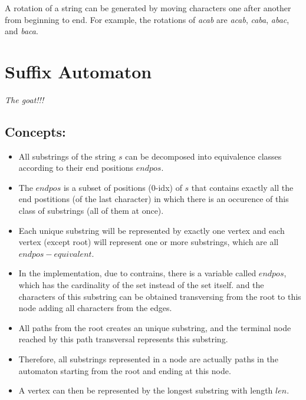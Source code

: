     A rotation of a string can be generated by moving characters one after another from beginning to end.
    For example, the rotations of \textit{acab} are \textit{acab}, \textit{caba}, \textit{abac}, and \textit{baca}.


\section{Suffix Automaton}

    \textit{The goat!!!} 

    \subsection{Concepts:}

    \begin{itemize}

        \item All substrings of the string $s$ can be decomposed into equivalence classes according to their end positions $endpos$.

        \item The $endpos$ is a subset of positions (0-idx) of $s$ that contains exactly all the end postitions (of the last character)
        in which there is an occurence of this class of substrings (all of them at once).

        \item Each unique substring will be represented by exactly one vertex and each vertex (except root) 
        will represent one or more substrings, which are all $endpos-equivalent$.

        \item In the implementation, due to contrains, there is a variable called $endpos$, which has the cardinality of the set instead of the set itself.
        and the characters of this substring can be obtained transversing from the root to this node adding all characters from the edges.

        \item All paths from the root creates an unique substring, and the terminal node reached by this path transversal represents this substring.

        \item Therefore, all substrings represented in a node are actually paths in the automaton starting from the root and ending at this node.

        \item A vertex can then be represented by the longest substring with length $len$.


\end{itemize}
